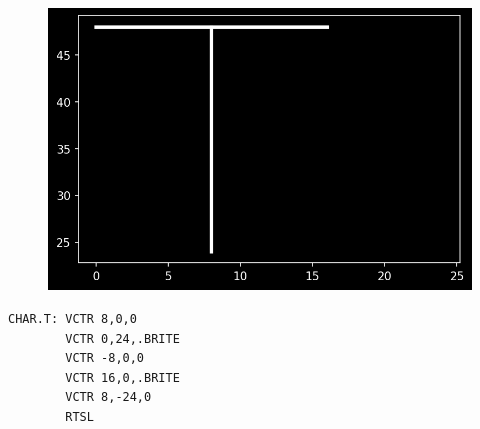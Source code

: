 \begin{minipage}[c]{0.48\linewidth}
\begin{figure}[H]
    \centering
    \begin{adjustbox}{width=4cm,center}
      \includegraphics[width=12cm]{src/literals/T.png}%
    \end{adjustbox}
\end{figure}
\end{minipage}
\begin{minipage}[c]{0.48\linewidth}
\begin{lstlisting}[basicstyle=\scriptsize\ttfamily]
CHAR.T: VCTR 8,0,0
        VCTR 0,24,.BRITE
        VCTR -8,0,0
        VCTR 16,0,.BRITE
        VCTR 8,-24,0
        RTSL
\end{lstlisting}
\vspace*{\fill}
\end{minipage}

